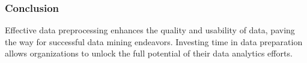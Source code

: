 \documentclass[aspectratio=169]{beamer}
\begin{document}
\begin{frame}[fragile]
    \frametitle{Conclusion}
    
    Effective data preprocessing enhances the quality and usability of data, paving the way for successful data mining endeavors. Investing time in data preparation allows organizations to unlock the full potential of their data analytics efforts.
\end{frame}
\end{document}
